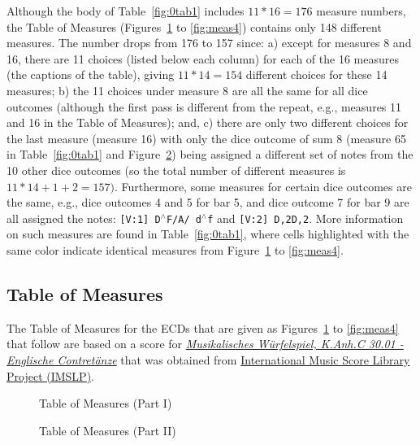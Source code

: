 \documentclass[letterpaper,x11names,svgnames,10pt]{article}
\begin{document}
Although the body of Table~\ref{fig:0tab1} includes $11*16 = 176$ measure numbers, the Table of Measures (Figures~\ref{fig:meas1} to \ref{fig:meas4}) contains only 148 different measures.  The number drops from 176 to 157 since: a) except for measures 8 and 16, there are 11 choices (listed below each column) for each of the 16 measures (the captions of the table), giving $11*14=154$ different choices for these 14 measures; b) the 11 choices under measure 8 are all the same for all dice outcomes (although the first pass is different from the repeat, e.g., measures 11 and 16 in the Table of Measures); and, c) there are only two different choices for the last measure (measure 16) with only the dice outcome of sum 8 (measure 65 in Table~\ref{fig:0tab1} and Figure~\ref{fig:meas2}) being assigned a different set of notes from the 10 other dice outcomes (so the total number of different measures is $11*14 + 1 + 2 = 157)$. Furthermore, some measures for certain dice outcomes are the same, e.g., dice outcomes 4 and 5 for bar 5, and dice outcome 7 for bar 9 are all assigned the notes: {\tt [V:1] D$^\wedge$F/A/ d$^\wedge$f} and {\tt [V:2] D,2D,2}.  More information on such measures are found in Table~\ref{fig:0tab1}, where cells highlighted with the same color indicate identical measures from Figure~\ref{fig:meas1} to \ref{fig:meas4}.

\subsection{Table of Measures}

The Table of Measures for the ECDs that are given as Figures~\ref{fig:meas1} to \ref{fig:meas4} that follow are based on a score for \href{https://imslp.org/wiki/Musikalische_W\%C3\%BCrfelspiele\%2C_K.Anh.C.30.01_(Mozart\%2C_Wolfgang_Amadeus)}{\em Musikalisches W\"{u}rfelspiel, K.Anh.C 30.01 - Englische Contret\"{a}nze} that was obtained from \href{http://imslp.org/}{International Music Score Library Project (IMSLP)}.  

\begin{figure}[H]
	\centering
	\def\svgwidth{0.975\columnwidth}
	
	\caption{Table of Measures (Part I)}
	\label{fig:meas1}
\end{figure}

\begin{figure}[H]
	\centering
	\def\svgwidth{0.975\columnwidth}
	
	\caption{Table of Measures (Part II)}
	\label{fig:meas2}
\end{figure}
\end{document}
